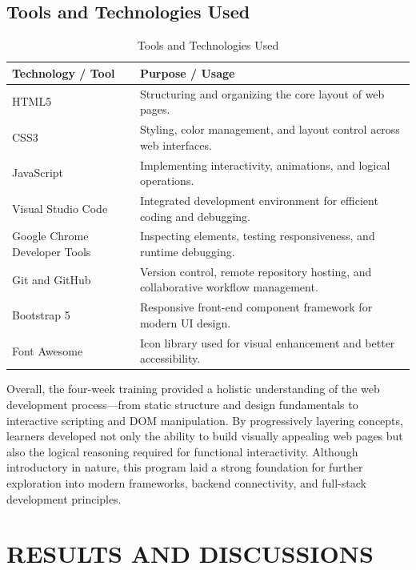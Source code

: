 \documentclass[a4paper,12pt,oneside]{report}
\numberwithin{equation}{chapter}
\numberwithin{figure}{chapter}
\numberwithin{table}{chapter}
\begin{document}
\vspace{5mm}
\noindent
\section{Tools and Technologies Used}

\begin{table}[H]
\centering
\caption{Tools and Technologies Used}
\begin{tabular}{|p{5cm}|p{8cm}|}
\hline
\textbf{Technology / Tool} & \textbf{Purpose / Usage} \\ \hline
HTML5 & Structuring and organizing the core layout of web pages. \\ \hline
CSS3 & Styling, color management, and layout control across web interfaces. \\ \hline
JavaScript & Implementing interactivity, animations, and logical operations. \\ \hline
Visual Studio Code & Integrated development environment for efficient coding and debugging. \\ \hline
Google Chrome Developer Tools & Inspecting elements, testing responsiveness, and runtime debugging. \\ \hline
Git and GitHub & Version control, remote repository hosting, and collaborative workflow management. \\ \hline
Bootstrap 5 & Responsive front-end component framework for modern UI design. \\ \hline
Font Awesome & Icon library used for visual enhancement and better accessibility. \\ \hline
\end{tabular}
\end{table}

\vspace{3mm}
Overall, the four-week training provided a holistic understanding of the web development process—from static structure and design fundamentals to interactive scripting and DOM manipulation. By progressively layering concepts, learners developed not only the ability to build visually appealing web pages but also the logical reasoning required for functional interactivity. Although introductory in nature, this program laid a strong foundation for further exploration into modern frameworks, backend connectivity, and full-stack development principles.


\newpage
\chapter{RESULTS AND DISCUSSIONS}
\end{document}
